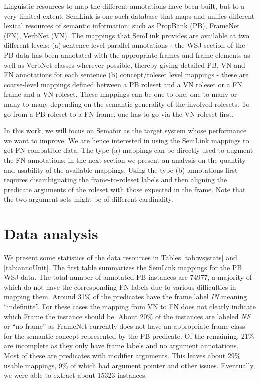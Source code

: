 \documentclass[11pt]{article}
\begin{document}
Linguistic resources to map the different annotations have been built, but to a very limited extent. SemLink \cite{semlink} is one such database that maps and unifies different lexical resources of semantic information: such as PropBank (PB), FrameNet (FN), VerbNet (VN). The mappings that SemLink provides are available at two different levels: (a) sentence level parallel annotations - the WSJ section of the PB data has been annotated with the appropriate frames and frame-elements as well as VerbNet classes wherever possible, thereby giving detailed PB, VN and FN annotations for each sentence (b) concept/roleset level mappings - these are coarse-level mappings defined between a PB roleset and a VN roleset or a FN frame and a VN roleset. These mappings can be one-to-one, one-to-many or many-to-many depending on the semantic generality of the involved rolesets. To go from a PB roleset to a FN frame, one has to go via the VN roleset first.

In this work, we will focus on Semafor as the target system whose performance we want to improve. We are hence interested in using the SemLink mappings to get FN compatible data. The type (a) mappings can be directly used to augment the FN annotations; in the next section we present an analysis on the quantity and usability of the available mappings. Using the type (b) annotations first requires disambiguating the frame-to-roleset labels and then aligning the predicate arguments of the roleset with those expected in the frame. Note that the two argument sets might be of different cardinality.

\section{Data analysis}
We present some statistics of the data resources in Tables \ref{tab:wsjstats} and \ref{tab:annoUnit}. The first table summarizes the SemLink mappings for the PB WSJ data. The total number of annotated PB instances are 74977, a majority of which do not have the corresponding FN labels due to various difficulties in mapping them. Around 31\% of the predicates have the frame label \textit{IN} meaning ``indefinite''. For these cases the mapping from VN to FN does not clearly indicate which Frame the instance should be. About 20\% of the instances are labeled \textit{NF} or ``no frame'' as FrameNet currently does not have an appropriate frame class for the semantic concept represented by the PB predicate. Of the remaining, 21\% are incomplete as they only have frame labels and no argument annotations. Most of these are predicates with modifier arguments. This leaves about 29\% usable mappings, 9\% of which had argument pointer and other issues. Eventually, we were able to extract about 15323 instances.
\end{document}
